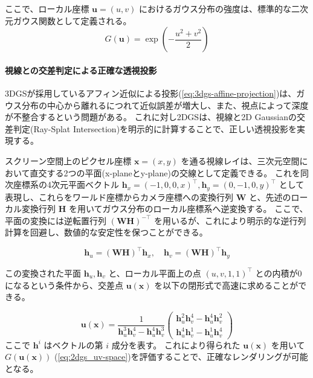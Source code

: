ここで、ローカル座標 $\bm{u} = (u, v)$ におけるガウス分布の強度は、標準的な二次元ガウス関数として定義される。
\begin{equation}\label{eq:2dgs_uv-space}
  G(\bm{u}) = \exp\left( - \frac{u^2 + v^2}{2} \right)
\end{equation}

\paragraph{視線との交差判定による正確な透視投影}
3DGSが採用しているアフィン近似による投影(\cref{eq:3dgs-affine-projection})は、ガウス分布の中心から離れるにつれて近似誤差が増大し、また、視点によって深度が不整合するという問題がある。
これに対し2DGSは、視線と2D Gaussianの交差判定(Ray-Splat Intersection)を明示的に計算することで、正しい透視投影を実現する。

スクリーン空間上のピクセル座標 $\bm{x} = (x, y)$ を通る視線レイは、三次元空間において直交する2つの平面(x-planeとy-plane)の交線として定義できる。
これを同次座標系の4次元平面ベクトル $\bm{h}_x = (-1, 0, 0, x)^\top, \bm{h}_y = (0, -1, 0, y)^\top$ として表現し、これらをワールド座標からカメラ座標への変換行列 $\bm{W}$ と、先述のローカル変換行列 $\bm{H}$ を用いてガウス分布のローカル座標系へ逆変換する。
ここで、平面の変換には逆転置行列 $(\bm{W}\bm{H})^{-\top}$ を用いるが、これにより明示的な逆行列計算を回避し、数値的な安定性を保つことができる。

\begin{equation}\label{eq:2dgs-h-transform}
  \bm{h}_u = (\bm{W}\bm{H})^\top \bm{h}_x, \quad \bm{h}_v = (\bm{W}\bm{H})^\top \bm{h}_y
\end{equation}

この変換された平面 $\bm{h}_u, \bm{h}_v$ と、ローカル平面上の点 $(u, v, 1, 1)^\top$ との内積が0になるという条件から、交差点 $\bm{u}(\bm{x})$ を以下の閉形式で高速に求めることができる。

\begin{equation}\label{eq:2dgs-intersection}
  \bm{u}(\bm{x}) = \frac{1}{\bm{h}_u^3 \bm{h}_v^4 - \bm{h}_u^4 \bm{h}_v^3} 
  \begin{pmatrix}
    \bm{h}_u^2 \bm{h}_v^4 - \bm{h}_u^4 \bm{h}_v^2 \\
    \bm{h}_u^4 \bm{h}_v^1 - \bm{h}_u^1 \bm{h}_v^4
  \end{pmatrix}
\end{equation}
ここで $\bm{h}^i$ はベクトルの第 $i$ 成分を表す。
これにより得られた $\bm{u}(\bm{x})$ を用いて $G(\bm{u}(\bm{x}))$ (\cref{eq:2dgs_uv-space})を評価することで、正確なレンダリングが可能となる。

